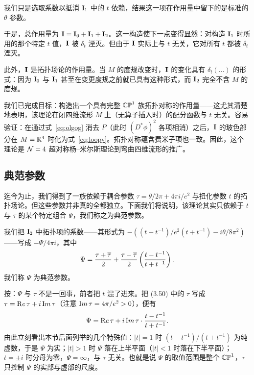 我们只是选取系数以抵消 ${{\cmmib I}}_1$ 中的 $t$ 依赖，结果这一项在作用量中留下的是标准的 $\theta$ 参数。

于是，总作用量为 ${{\cmmib I}}={{\cmmib I}}_0+{{\cmmib I}}_1+{{\cmmib I}}_2$。这一构造使下一点变得显然：对构造 ${{\cmmib I}}_1$ 时所用的那个特定 $t$ 值，${{\cmmib I}}$ 被 $\delta_t$ 湮灭。但由于 ${{\cmmib I}}$ 实际上与 $t$ 无关，它对所有 $t$ 都被 $\delta_t$ 湮灭。

此外，${{\cmmib I}}$ 是拓扑场论的作用量。当 $M$ 的度规改变时，${{\cmmib I}}$ 的变化具有 $\delta_t(\dots)$ 的形式：因为 ${{\cmmib I}}_0$ 与 ${{\cmmib I}}_1$ 甚至在变更度规之前就已具有这种形式，而 ${{\cmmib I}}_2$ 完全不含 $M$ 的度规。

我们已完成目标：构造出一个具有完整 ${\Bbb{ CP}}^1$ 族拓扑对称的作用量——这尤其清楚地表明，该理论在闭四维流形 $M$ 上（无算子插入时）的配分函数与 $t$ 无关。容易验证：在通过式~\eqref{eq:olgog} 消去 $P$（此时 $(D^*\phi)^2$ 各项相消）之后，${{\cmmib I}}$ 的玻色部分在 $M=\Bbb{R}^4$ 时化为式~\eqref{eq:loopy}。拓扑对称蕴含费米子项也一致。因此，这个理论是 ${\EUN}=4$ 超对称杨--米尔斯理论到弯曲四维流形的推广。

\subsection{典范参数}

\label{sec:canonpar}

迄今为止，我们得到了一族依赖于耦合参数 $\tau=\theta/2\pi+4\pi i/e^2$ 与扭化参数 $t$ 的拓扑场论。但这些参数并非真的全都独立。下面我们将说明，该理论其实只依赖于 $t$ 与 $\tau$ 的某个特定组合 $\Psi$，我们称之为典范参数。

我们把 ${{\cmmib I}}_2$ 中拓扑项的系数——其形式为 $-\left({(t-t^{-1})/e^2(t+t^{-1})}-i{\theta/8\pi^2}\right)$——写成 $-\Psi/4\pi i$，其中
\setcounter{equation}{49}
\begin{equation}\label{eq:yorgo}
\Psi = {\tau+\bar\tau\over 2}+{\tau-\bar\tau\over
2}\left({t-t^{-1}\over t+t^{-1}}\right).
\end{equation}
我们称 $\Psi$ 为典范参数。

\begin{yizhu}[含糊点拨]
按：$\Psi$ 与 $\tau$ 不是一回事，前者把 $t$ 混了进来。把 (3.50) 中的 $\tau$ 写成 $\tau={\rm Re}\,\tau+i\,{\rm Im}\,\tau$（注意 ${\rm Im}\,\tau=4\pi/e^2>0$），便有
\[
\Psi={\rm Re}\,\tau+i\,{\rm Im}\,\tau\cdot{t-t^{-1}\over t+t^{-1}}.
\]
由此立刻看出本节后面列举的几个特殊值：$|t|=1$ 时 $(t-t^{-1})/(t+t^{-1})$ 为纯虚数，于是 $\Psi$ 为实；$|t|>1$ 时 $\Psi$ 落在上半平面（$|t|<1$ 时落在下半平面）；$t=\pm i$ 时分母为零，$\Psi=\infty$，与 $\tau$ 无关。也就是说 $\Psi$ 的取值范围是整个 $\Bbb{CP}^1$，$\tau$ 只控制 $\Psi$ 的实部与虚部的尺度。
\end{yizhu}

